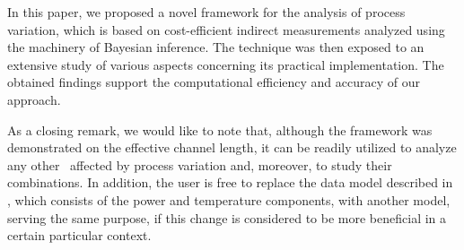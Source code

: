 In this paper, we proposed a novel framework for the analysis of process variation, which is based on cost-efficient indirect measurements analyzed using the machinery of Bayesian inference. The technique was then exposed to an extensive study of various aspects concerning its practical implementation. The obtained findings support the computational efficiency and accuracy of our approach.

As a closing remark, we would like to note that, although the framework was demonstrated on the effective channel length, it can be readily utilized to analyze any other \qois\ affected by process variation and, moreover, to study their combinations. In addition, the user is free to replace the data model described in , which consists of the power and temperature components, with another model, serving the same purpose, if this change is considered to be more beneficial in a certain particular context.
